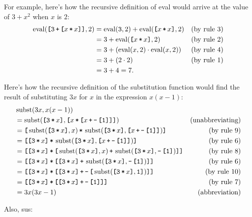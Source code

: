 \documentclass[12pt]{article}
\begin{document}
\newcommand{\lb}{\textbf{\s{[}}}
\newcommand{\rb}{\s{]}}
\newcommand{\aeplus}{\,\s{+}\,}
\newcommand{\aetimes}{\,\s{*}\,}
\newcommand{\aeAdd}[2]{\lb #1 \aeplus #2 \rb}
\newcommand{\aeMul}[2]{\lb #1 \aetimes #2 \rb}
\newcommand{\aeNeg}[1]{\s{-}\, \lb #1 \rb}

For example, here's how the recursive definition of eval would arrive at the value of $3 + x^2$ when $x$ is $2$:
\begin{align*}
    \eval(\aeAdd{\s{3}}{\aeMul{x}{x}}, 2) &= \eval(\s{3}, 2) + \eval(\aeMul{x}{x}, 2) & \text{(by rule~3)} \\
    &= 3 + \eval(\aeMul{x}{x}, 2) & \text{(by rule~2)} \\
    &= 3 + (\eval(x, 2) \cdot \eval(x, 2)) & \text{(by rule~4)} \\
    &= 3 + (2 \cdot 2) & \text{(by rule~1)} \\
    &= 3 + 4 = 7.
\end{align*}

Here's how the recursive definition of the substitution function would find the result of substituting $3x$ for $x$ in the expression $x(x-1)$:
\begin{align*}
    &\subst(3x, x(x-1)) \\
    &= \subst(\aeMul{\s{3}}{x}, \aeMul{x}{\aeAdd{x}{\aeNeg{\s{1}}}}) & \text{(unabbreviating)} \\
    &= \aeMul{\subst(\aeMul{\s{3}}{x}, x)}{\subst(\aeMul{\s{3}}{x}, \aeAdd{x}{\aeNeg{\s{1}}})} & \text{(by rule~9)} \\
    &= \aeMul{\aeMul{\s{3}}{x}}{\subst(\aeMul{\s{3}}{x}, \aeAdd{x}{\aeNeg{\s{1}}})} & \text{(by rule~6)} \\
    &= \aeMul{\aeMul{\s{3}}{x}}{\aeAdd{\subst(\aeMul{\s{3}}{x},     x)}{\subst(\aeMul{\s{3}}{x}, \aeNeg{\s{1}})}} & \text{(by rule~8)} \\
    &= \aeMul{\aeMul{\s{3}}{x}}{\aeAdd{\aeMul{\s{3}}{x}}{\subst(\aeMul{\s{3}}{x}, \aeNeg{\s{1}})}} & \text{(by rule~6)} \\
    &= \aeMul{\aeMul{\s{3}}{x}}{\aeAdd{\aeMul{\s{3}}{x}}{\aeNeg{\subst(\aeMul{\s{3}}{x}, \s{1}})}} & \text{(by rule~10)} \\
    &= \aeMul{\aeMul{\s{3}}{x}}{\aeAdd{\aeMul{\s{3}}{x}}{\aeNeg{\s{1}}}} & \text{(by rule~7)} \\
    &= 3x(3x-1) & \text{(abbreviation)}
\end{align*}

Also, sus:
\begin{figure}[H]
    \centering
\end{figure}
\end{document}
